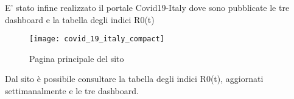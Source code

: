 
\noindent E' stato infine realizzato il portale Covid19-Italy dove sono pubblicate le tre dashboard e la tabella degli indici R0(t)

\begin{figure}[htp]
    \centering
    \texttt{[image: covid\_19\_italy\_compact]}
    \caption{Pagina principale del sito}
\end{figure}

\noindent Dal sito è possibile consultare la tabella degli indici R0(t), aggiornati settimanalmente e le tre dashboard.
